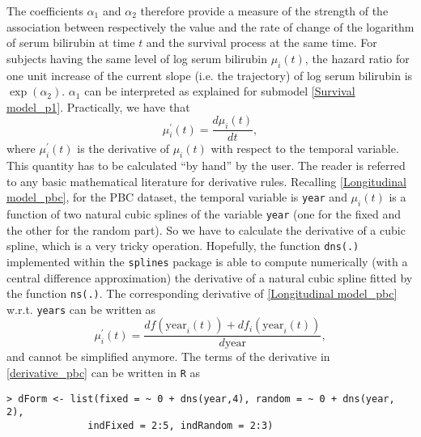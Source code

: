 \documentclass[12pt]{article}
\begin{document}
The coefficients $\alpha_1$ and $\alpha_2$ therefore provide a measure of the strength of the association between respectively the value and the rate of change of the logarithm of serum bilirubin at time $t$ and the survival process at the same time. For subjects having the same level of log serum bilirubin $\mu_i(t)$, the hazard ratio for one unit increase of the current slope (i.e. the trajectory) of log serum bilirubin is $\exp (\alpha_2)$. $\alpha_1$ can be interpreted as explained for submodel \eqref{Survival model_p1}.
Practically, we have that 
\begin{equation}
\mu_i^{'}(t)=\frac{d\mu_i(t)}{dt}, 
\end{equation}
where $\mu_i^{'}(t)$ is the derivative of $\mu_i(t)$ with respect to the temporal variable. This quantity has to be calculated ``by hand'' by the user. The reader is referred to any basic mathematical literature for derivative rules. Recalling \eqref{Longitudinal model_pbc}, for the PBC dataset, the temporal variable is \texttt{year} and $\mu_i(t)$ is a function of two natural cubic splines of the variable \texttt{year} (one for the fixed and the other for the random part). So we have to calculate the derivative of a cubic spline, which is a very tricky operation. Hopefully, the function \texttt{dns(.)} implemented within the \texttt{splines} package is able to compute numerically (with a central difference approximation) the derivative of a natural cubic spline fitted by the function \texttt{ns(.)}.
The corresponding derivative of \eqref{Longitudinal model_pbc} w.r.t. \texttt{years} can be written as
\begin{equation}
\mu_i^{'}(t)=\frac{df(\text{year}_i(t))+df_i(\text{year}_i(t))}{d\text{year}},
\label{derivative_pbc} 
\end{equation}
and cannot be simplified anymore. 
The terms of the derivative in \eqref{derivative_pbc} can be written in \texttt{R} as
\begin{verbatim}
> dForm <- list(fixed = ~ 0 + dns(year,4), random = ~ 0 + dns(year, 2), 
              indFixed = 2:5, indRandom = 2:3)
\end{verbatim}
\end{document}
